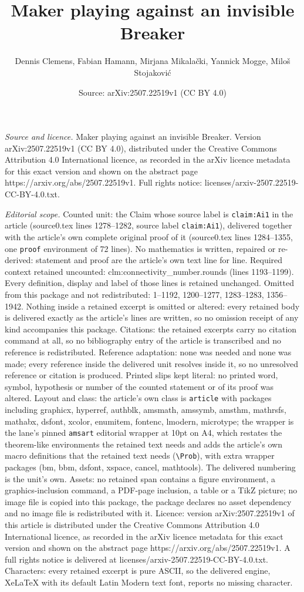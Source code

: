 \documentclass[10pt,a4paper]{amsart}
\title[Maker playing against an invisible Breaker]{Maker playing against an invisible Breaker}
\author{Dennis Clemens, Fabian Hamann, Mirjana Mikala\v{c}ki, Yannick Mogge, Milo\v{s} Stojakovi\'c}
\date{Source: arXiv:2507.22519v1 (CC BY 4.0)}
\begin{document}
\maketitle

\noindent\emph{Source and licence.} Maker playing against an invisible Breaker. Version arXiv:2507.22519v1 (CC BY 4.0), distributed under the Creative Commons Attribution 4.0 International licence, as recorded in the arXiv licence metadata for this exact version and shown on the abstract page https://arxiv.org/abs/2507.22519v1. Full rights notice: licenses/arxiv-2507.22519-CC-BY-4.0.txt.\par\smallskip

\noindent\textit{Editorial scope.} Counted unit: the Claim whose source label is \texttt{claim:Ai1} in the article (source0.tex lines 1278--1282, source label \texttt{claim:Ai1}), delivered together with the article's own complete original proof of it (source0.tex lines 1284--1355, one \texttt{proof} environment of 72 lines). No mathematics is written, repaired or re-derived: statement and proof are the article's own text line for line. Required context retained uncounted: clm:connectivity\_number.rounds (lines 1193--1199). Every definition, display and label of those lines is retained unchanged. Omitted from this package and not redistributed: 1--1192, 1200--1277, 1283--1283, 1356--1942. Nothing inside a retained excerpt is omitted or altered: every retained body is delivered exactly as the article's lines are written, so no omission receipt of any kind accompanies this package. Citations: the retained excerpts carry no citation command at all, so no bibliography entry of the article is transcribed and no reference is redistributed. Reference adaptation: none was needed and none was made; every reference inside the delivered unit resolves inside it, so no unresolved reference or citation is produced. Printed slips kept literal: no printed word, symbol, hypothesis or number of the counted statement or of its proof was altered. Layout and class: the article's own class is \texttt{article} with packages including graphicx, hyperref, authblk, amsmath, amssymb, amsthm, mathrsfs, mathabx, dsfont, xcolor, enumitem, fontenc, lmodern, microtype; the wrapper is the lane's pinned \texttt{amsart} editorial wrapper at 10pt on A4, which restates the theorem-like environments the retained text needs and adds the article's own macro definitions that the retained text needs (\texttt{\textbackslash Prob}), with extra wrapper packages (bm, bbm, dsfont, xspace, cancel, mathtools). The delivered numbering is the unit's own. Assets: no retained span contains a figure environment, a graphics-inclusion command, a PDF-page inclusion, a table or a TikZ picture; no image file is copied into this package, the package declares no asset dependency and no image file is redistributed with it. Licence: version arXiv:2507.22519v1 of this article is distributed under the Creative Commons Attribution 4.0 International licence, as recorded in the arXiv licence metadata for this exact version and shown on the abstract page https://arxiv.org/abs/2507.22519v1. A full rights notice is delivered at licenses/arxiv-2507.22519-CC-BY-4.0.txt. Characters: every retained excerpt is pure ASCII, so the delivered engine, XeLaTeX with its default Latin Modern text font, reports no missing character.
\end{document}
